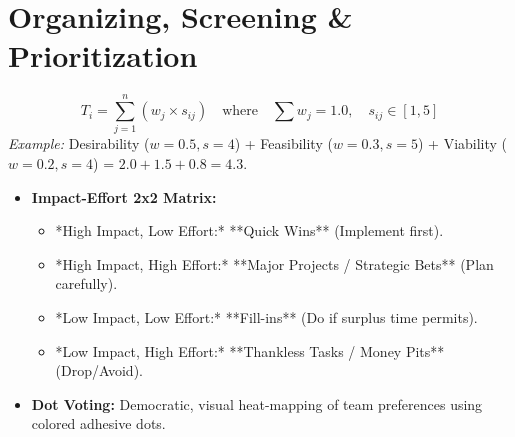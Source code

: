 \section{Organizing, Screening \& Prioritization}

\begin{formulabox}
\begin{equation*}
T_i = \sum_{j=1}^n \left( w_j \times s_{ij} \right) \quad \text{where} \quad \sum w_j = 1.0, \quad s_{ij} \in [1, 5]
\end{equation*}
\textit{Example:} Desirability ($w=0.5, s=4$) + Feasibility ($w=0.3, s=5$) + Viability ($w=0.2, s=4$) = $2.0 + 1.5 + 0.8 = \mathbf{4.3}$.
\end{formulabox}

\begin{itemize}[leftmargin=1.2em, itemsep=3pt]
    \item \textbf{Impact-Effort 2x2 Matrix:}
    \begin{itemize}
        \item *High Impact, Low Effort:* **Quick Wins** (Implement first).
        \item *High Impact, High Effort:* **Major Projects / Strategic Bets** (Plan carefully).
        \item *Low Impact, Low Effort:* **Fill-ins** (Do if surplus time permits).
        \item *Low Impact, High Effort:* **Thankless Tasks / Money Pits** (Drop/Avoid).
    \end{itemize}
    \item \textbf{Dot Voting:} Democratic, visual heat-mapping of team preferences using colored adhesive dots.
\end{itemize}
